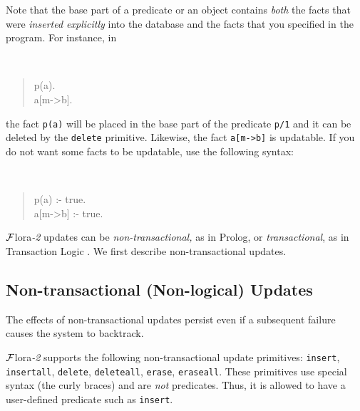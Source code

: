 \documentclass[11pt]{article}
\newcommand{\FLORA}{{\mbox{\sc ${\cal F}${lora}\rm\emph{-2}}}\xspace}
\begin{document}
Note that the base part of a predicate or an object contains \emph{both}
the facts that were \emph{inserted explicitly} into the database and the
facts that you specified in the program. For instance, in
{\tt
\begin{quote}
 p(a).\\
 a[m->b].
\end{quote}
}
\noindent
the fact {\tt p(a)} will be placed in the base part of the
predicate {\tt p/1}  and it can be deleted by the {\tt delete}
primitive. Likewise, the fact {\tt a[m->b]} is updatable. If you do not
want some facts to be updatable, use the following syntax:
{\tt
\begin{quote}
 p(a) :- true.\\
 a[m->b] :- true.
\end{quote}
}


\FLORA updates can be \emph{non-transactional,} as in Prolog, or
\emph{transactional}, as in Transaction Logic
\cite{trans-chapter-98,trans-tcs94}.  We first describe non-transactional
updates.


\subsection{Non-transactional (Non-logical) Updates}
\label{sec:non-transactional-updates}

%
The effects of non-transactional updates persist even if a subsequent failure
causes the system to backtrack.

\FLORA supports the following non-transactional update primitives:
{\tt insert}, {\tt insertall}, {\tt delete}, {\tt deleteall},
{\tt erase}, {\tt eraseall}. These primitives use special syntax (the curly
braces) and are \emph{not} predicates. Thus, it is allowed to have a
user-defined predicate such as {\tt insert}.

%
\end{document}
